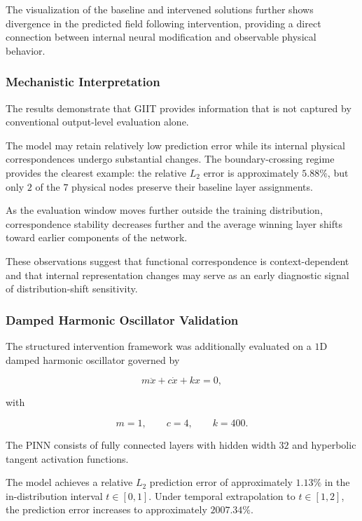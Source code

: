 \documentclass[12pt,singleside,a4paper]{article}
\begin{document}
The visualization of the baseline and intervened solutions further
shows divergence in the predicted field following intervention,
providing a direct connection between internal neural modification and
observable physical behavior.


\subsubsection{Mechanistic Interpretation}

The results demonstrate that GIIT provides information that is not
captured by conventional output-level evaluation alone.

The model may retain relatively low prediction error while its
internal physical correspondences undergo substantial changes. The
boundary-crossing regime provides the clearest example: the relative
$L_2$ error is approximately $5.88\%$, but only $2$ of the $7$ physical
nodes preserve their baseline layer assignments.

As the evaluation window moves further outside the training
distribution, correspondence stability decreases further and the
average winning layer shifts toward earlier components of the network.

These observations suggest that functional correspondence is
context-dependent and that internal representation changes may serve
as an early diagnostic signal of distribution-shift sensitivity.


\subsubsection{Damped Harmonic Oscillator Validation}

The structured intervention framework was additionally evaluated on a
$1$D damped harmonic oscillator governed by

\begin{equation}
    m\ddot{x} + c\dot{x} + kx = 0,
\end{equation}

with

\begin{equation}
    m=1,\qquad c=4,\qquad k=400.
\end{equation}

The PINN consists of fully connected layers with hidden width $32$
and hyperbolic tangent activation functions.

The model achieves a relative $L_2$ prediction error of approximately
$1.13\%$ in the in-distribution interval $t\in[0,1]$. Under temporal
extrapolation to $t\in[1,2]$, the prediction error increases to
approximately $2007.34\%$.
\end{document}
